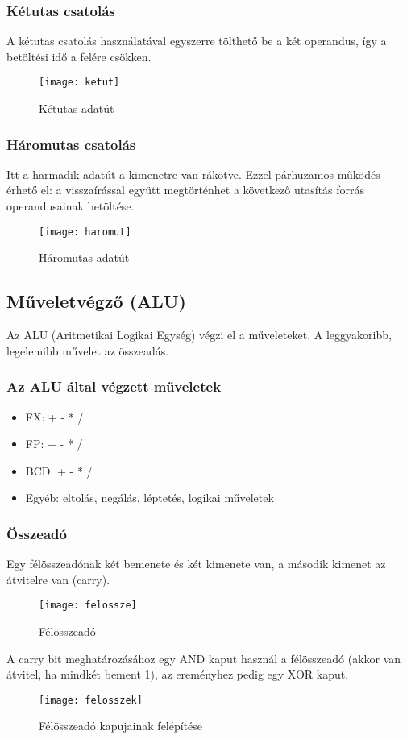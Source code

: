 \subsubsection{Kétutas csatolás}
A kétutas csatolás használatával egyszerre tölthető be a két operandus, így a betöltési idő a felére csökken.
\begin{figure}[H]
    \texttt{[image: ketut]}
    \centering
    \caption{Kétutas adatút}
    \label{fig:ketut}
\end{figure}

\subsubsection{Háromutas csatolás}
Itt a harmadik adatút a kimenetre van rákötve.
Ezzel párhuzamos működés érhető el: a visszaírással együtt megtörténhet a következő utasítás forrás operandusainak betöltése.
\begin{figure}[H]
    \texttt{[image: haromut]}
    \centering
    \caption{Háromutas adatút}
    \label{fig:haromut}
\end{figure}

\subsection{Műveletvégző (ALU)}
Az ALU (Aritmetikai Logikai Egység) végzi el a műveleteket.
A leggyakoribb, legelemibb művelet az összeadás.

\subsubsection{Az ALU által végzett műveletek}
\begin{itemize}
    \item FX: + - * /
    \item FP: + - * /
    \item BCD: + - * /
    \item Egyéb: eltolás, negálás, léptetés, logikai műveletek
\end{itemize}

\subsubsection{Összeadó}
Egy félösszeadónak két bemenete és két kimenete van, a második kimenet az átvitelre van (carry).
\begin{figure}[H]
    \texttt{[image: felossze]}
    \centering
    \caption{Félösszeadó}
    \label{fig:felossze}
\end{figure}
A carry bit meghatározásához egy AND kaput használ a félösszeadó (akkor van átvitel, ha mindkét bement 1), az ereményhez pedig egy XOR kaput.
\begin{figure}[H]
    \texttt{[image: felosszek]}
    \centering
    \caption{Félösszeadó kapujainak felépítése}
    \label{fig:felosszek}
\end{figure}

